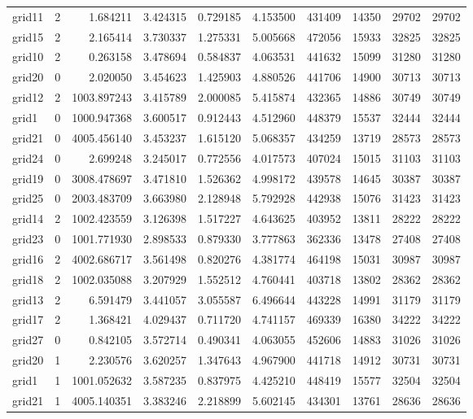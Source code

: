 \begin{longtable}{|l|r|r|r|r|r|r|r|r|r|}
grid11 & 2 & 1.684211 & 3.424315 & 0.729185 & 4.153500 & 431409 & 14350 & 29702 & 29702 \\
grid15 & 2 & 2.165414 & 3.730337 & 1.275331 & 5.005668 & 472056 & 15933 & 32825 & 32825 \\
grid10 & 2 & 0.263158 & 3.478694 & 0.584837 & 4.063531 & 441632 & 15099 & 31280 & 31280 \\
grid20 & 0 & 2.020050 & 3.454623 & 1.425903 & 4.880526 & 441706 & 14900 & 30713 & 30713 \\
grid12 & 2 & 1003.897243 & 3.415789 & 2.000085 & 5.415874 & 432365 & 14886 & 30749 & 30749 \\
grid1 & 0 & 1000.947368 & 3.600517 & 0.912443 & 4.512960 & 448379 & 15537 & 32444 & 32444 \\
grid21 & 0 & 4005.456140 & 3.453237 & 1.615120 & 5.068357 & 434259 & 13719 & 28573 & 28573 \\
grid24 & 0 & 2.699248 & 3.245017 & 0.772556 & 4.017573 & 407024 & 15015 & 31103 & 31103 \\
grid19 & 0 & 3008.478697 & 3.471810 & 1.526362 & 4.998172 & 439578 & 14645 & 30387 & 30387 \\
grid25 & 0 & 2003.483709 & 3.663980 & 2.128948 & 5.792928 & 442938 & 15076 & 31423 & 31423 \\
grid14 & 2 & 1002.423559 & 3.126398 & 1.517227 & 4.643625 & 403952 & 13811 & 28222 & 28222 \\
grid23 & 0 & 1001.771930 & 2.898533 & 0.879330 & 3.777863 & 362336 & 13478 & 27408 & 27408 \\
grid16 & 2 & 4002.686717 & 3.561498 & 0.820276 & 4.381774 & 464198 & 15031 & 30987 & 30987 \\
grid18 & 2 & 1002.035088 & 3.207929 & 1.552512 & 4.760441 & 403718 & 13802 & 28362 & 28362 \\
grid13 & 2 & 6.591479 & 3.441057 & 3.055587 & 6.496644 & 443228 & 14991 & 31179 & 31179 \\
grid17 & 2 & 1.368421 & 4.029437 & 0.711720 & 4.741157 & 469339 & 16380 & 34222 & 34222 \\
grid27 & 0 & 0.842105 & 3.572714 & 0.490341 & 4.063055 & 452606 & 14883 & 31026 & 31026 \\
grid20 & 1 & 2.230576 & 3.620257 & 1.347643 & 4.967900 & 441718 & 14912 & 30731 & 30731 \\
grid1 & 1 & 1001.052632 & 3.587235 & 0.837975 & 4.425210 & 448419 & 15577 & 32504 & 32504 \\
grid21 & 1 & 4005.140351 & 3.383246 & 2.218899 & 5.602145 & 434301 & 13761 & 28636 & 28636 \\

\end{longtable}
